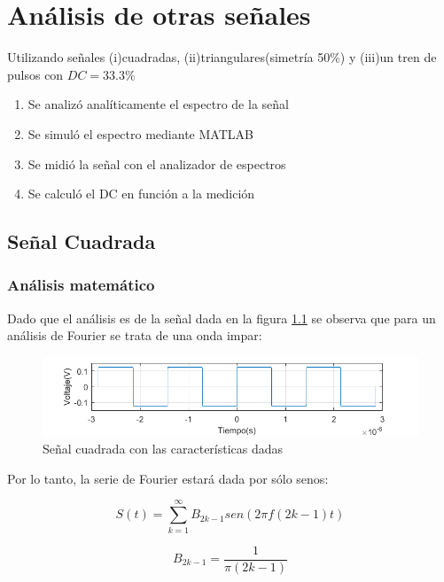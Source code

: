 \chapter{Análisis de otras señales}
Utilizando señales (i)cuadradas, (ii)triangulares(simetría 50\%) y (iii)un tren de pulsos con $DC=33.3\%$
\begin{enumerate}
    \item Se analizó analíticamente el espectro de la señal
    \item Se simuló el espectro mediante MATLAB
    \item Se midió la señal con el analizador de espectros
    \item Se calculó el DC en función a la medición
\end{enumerate}

\section{Señal Cuadrada}
    \subsection{Análisis matemático}

    Dado que el análisis es de la señal dada en la figura \ref{fig:2,1,1}
    se observa que para un análisis de Fourier se trata de una onda
    impar:

    \begin{figure}[ht]
        \begin{center}
            \includegraphics[width=\linewidth]{contenido/img/sig_sqr.png}
            \caption{Señal cuadrada con las características dadas}
            \label{fig:2,1,1}
        \end{center}
    \end{figure}

    Por lo tanto, la serie de Fourier estará dada por sólo senos:

    \begin{equation}
        S(t) = \sum_{k=1}^{\infty} B_{2k-1} sen(2 \pi f (2k-1) t)
    \end{equation}

    \begin{equation}
        B_{2k-1} =\frac{1}{\pi (2k-1)}
    \end{equation}

